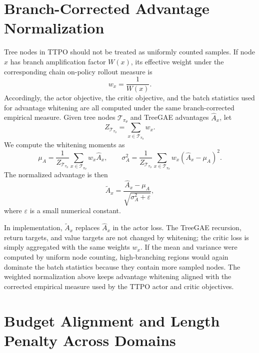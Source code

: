 \appendix

\section{Branch-Corrected Advantage Normalization}
\label{app:advantage-normalization}

Tree nodes in TTPO should not be treated as uniformly counted samples. If node $x$ has branch amplification factor $W(x)$, its effective weight under the corresponding chain on-policy rollout measure is
\begin{equation}
w_x=\frac{1}{W(x)}.
\end{equation}
Accordingly, the actor objective, the critic objective, and the batch statistics used for advantage whitening are all computed under the same branch-corrected empirical measure. Given tree nodes $\mathcal{T}_{\pi_\theta}$ and TreeGAE advantages $\hat A_x$, let
\begin{equation}
Z_{\mathcal{T}_{\pi_\theta}}=\sum_{x\in\mathcal{T}_{\pi_\theta}} w_x .
\end{equation}
We compute the whitening moments as
\begin{equation}
\mu_A
=
\frac{1}{Z_{\mathcal{T}_{\pi_\theta}}}
\sum_{x\in\mathcal{T}_{\pi_\theta}} w_x \hat A_x,
\qquad
\sigma_A^2
=
\frac{1}{Z_{\mathcal{T}_{\pi_\theta}}}
\sum_{x\in\mathcal{T}_{\pi_\theta}} w_x(\hat A_x-\mu_A)^2 .
\end{equation}
The normalized advantage is then
\begin{equation}
\tilde A_x
=
\frac{\hat A_x-\mu_A}{\sqrt{\sigma_A^2+\varepsilon}},
\end{equation}
where $\varepsilon$ is a small numerical constant.

In implementation, $\tilde A_x$ replaces $\hat A_x$ in the actor loss. The TreeGAE recursion, return targets, and value targets are not changed by whitening; the critic loss is simply aggregated with the same weights $w_x$. If the mean and variance were computed by uniform node counting, high-branching regions would again dominate the batch statistics because they contain more sampled nodes. The weighted normalization above keeps advantage whitening aligned with the corrected empirical measure used by the TTPO actor and critic objectives.

\section{Budget Alignment and Length Penalty Across Domains}
\label{app:budget-alignment}

